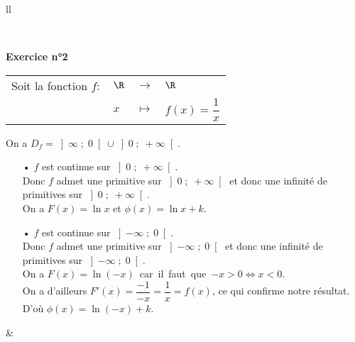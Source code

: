 \begin{tabular}{ll}
\begin{minipage}{5cm}
\begin{tikzpicture}[line cap=round,line join=round,>=triangle 45,x=1.0cm,y=1.0cm,scale=.9]
\end{tikzpicture}
\end{minipage}
\\
\begin{minipage}{8cm}
\textbf{Exercice n°2} \\

\begin{tabular}{llll}
Soit la fonction $f:$ & $\R$ & $\longrightarrow$ & $\R$ \\
& $x$ & $\longmapsto$ & $f(x) = \dfrac{1}{x}$ \\ 
\end{tabular}

\vspace*{.3cm}

On a $D_f = \left]\infty \; ; \; 0 \right[ \cup \left] 0 \; ; \; +\infty\right[$. \\

\begin{itemize}
\item[•] $f$ est continue sur $\left]0 \; ; \; +\infty\right[$. \\
Donc $f$ admet une primitive sur $\left]0 \; ; \; +\infty\right[$ et donc une infinité de primitives sur $\left]0 \; ; \; +\infty\right[$. \\

On a $F(x) = \ln x$ et $\phi\left(x\right) =\ln x + k$. \\

\item[•] $f$ est continue sur $\left]-\infty \; ; \; 0\right[$. \\
Donc $f$ admet une primitive sur $\left]-\infty \; ; \; 0\right[$ et donc une infinité de primitives sur $\left]-\infty \; ; \; 0\right[$. \\

On a \hbox{$F(x) = \ln \left(-x\right)$ car il faut que $-x > 0 \Longleftrightarrow x < 0$.} \\

On a d'ailleurs $F'(x) = \dfrac{-1}{-x} = \dfrac{1}{x} = f(x)$, ce qui confirme notre résultat. \\

D'où $\phi\left(x\right) = \ln \left(-x\right) + k$. \\
\end{itemize}
\end{minipage}
&
\begin{minipage}{5cm}
\end{minipage}
\end{tabular}
